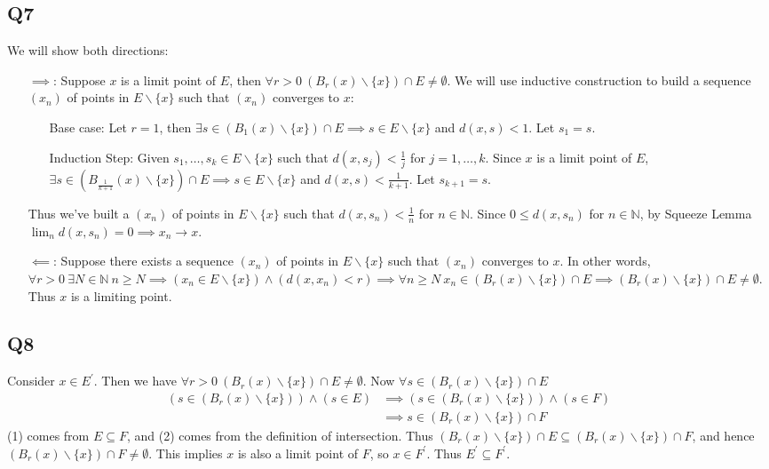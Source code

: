 \documentclass[12pt,lettersize]{article}
\newcommand{\N}{\mathbb{N}}
\theoremstyle{remark}
\begin{document}
	\subsection*{Q7}
	We will show both directions:
	\begin{itemize}
		\item[$\implies$:] Suppose $x$ is a limit point of $E$, then $\forall r>0\ (B_r(x)\backslash\{x\})\cap E\neq\emptyset$. We will use inductive construction to build a sequence $(x_n)$ of points in $E\backslash\{x\}$ such that $(x_n)$ converges to $x$:
		\begin{itemize}
			\item[Base case:] Let $r=1$, then $\exists s\in(B_1(x)\backslash\{x\})\cap E \implies s\in E\backslash\{x\}$ and $d(x,s)<1$. Let $s_1=s$.
			\item[Induction Step:] Given $s_1,\dots,s_k\in E\backslash\{x\}$ such that $d(x,s_j)<\frac{1}{j}$ for $j=1,\dots,k$. Since $x$ is a limit point of $E$, $\exists s\in(B_{\frac{1}{k+1}}(x)\backslash\{x\})\cap E\implies s\in E\backslash\{x\}$ and $d(x,s)<\frac{1}{k+1}$. Let $s_{k+1}=s$.
		\end{itemize}
		Thus we've built a $(x_n)$ of points in $E\backslash\{x\}$ such that $d(x,s_n)<\frac{1}{n}$ for $n\in\N$. Since $0\leq d(x,s_n)$ for $n\in\N$, by Squeeze Lemma $\lim_nd(x,s_n)=0\implies x_n\rightarrow x$.
		\item[$\impliedby$:] Suppose there exists a sequence $(x_n)$ of points in $E\backslash\{x\}$ such that $(x_n)$ converges to $x$. In other words, $\forall r>0\ \exists N\in\N\ n\geq N\implies (x_n\in E\backslash\{x\})\land (d(x,x_n)<r)\implies \forall n\geq N\ x_n\in (B_r(x)\backslash\{x\})\cap E\implies (B_r(x)\backslash\{x\})\cap E\neq\emptyset$. Thus $x$ is a limiting point.
	\end{itemize}
	\newpage
	
	\setcounter{equation}{0}
	\subsection*{Q8}
	Consider $x\in E^\prime$. Then we have $\forall r>0\ (B_r(x)\backslash\{x\})\cap E\neq\emptyset$. Now $\forall s\in(B_r(x)\backslash\{x\})\cap E$
	\begin{align}
		(s\in(B_r(x)\backslash\{x\}))\land(s\in E) &\implies (s\in(B_r(x)\backslash\{x\}))\land(s\in F)\\
												   &\implies s\in(B_r(x)\backslash\{x\})\cap F
	\end{align}
	(1) comes from $E\subseteq F$, and (2) comes from the definition of intersection. Thus $(B_r(x)\backslash\{x\})\cap E\subseteq (B_r(x)\backslash\{x\})\cap F$, and hence $(B_r(x)\backslash\{x\})\cap F\neq\emptyset$. This implies $x$ is also a limit point of $F$, so $x\in F^\prime$. Thus $E^\prime\subseteq F^\prime$.
	\newpage
	
\end{document}
